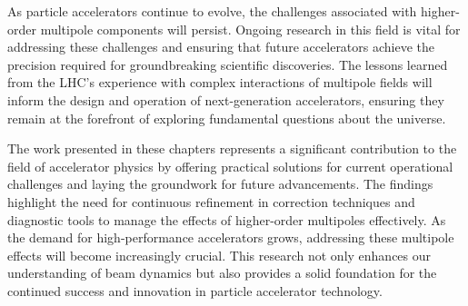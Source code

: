 {As particle accelerators continue to evolve, the challenges associated with higher-order multipole
components will persist. Ongoing research in this field is vital for addressing these challenges and
ensuring that future accelerators achieve the precision required for groundbreaking scientific
discoveries. The lessons learned from the LHC's experience with complex interactions of multipole
fields will inform the design and operation of next-generation accelerators, ensuring they remain at
the forefront of exploring fundamental questions about the universe.

The work presented in these chapters represents a significant contribution to the field of
accelerator physics by offering practical solutions for current operational challenges and laying
the groundwork for future advancements. The findings highlight the need for continuous refinement in
correction techniques and diagnostic tools to manage the effects of higher-order multipoles
effectively. As the demand for high-performance accelerators grows, addressing these multipole
effects will become increasingly crucial. This research not only enhances our understanding of beam
dynamics but also provides a solid foundation for the continued success and innovation in particle
accelerator technology.

} %


\chapter{}

